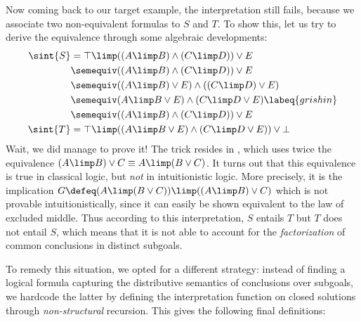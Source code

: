 Now coming back to our target example,
the interpretation still fails, because we associate two non-equivalent
formulas to $S$ and $T$. To show this, let us try to derive the equivalence
through some algebraic developments:
\begin{align}
  \sint{S} &= \top \limp ((A \limp B) \land (C \limp D)) \lor E \nonumber\\
              &\semequiv ((A \limp B) \land (C \limp D)) \lor E \nonumber\\
              &\semequiv ((A \limp B) \lor E) \land ((C \limp D) \lor E) \nonumber\\
              &\semequiv (A \limp B \lor E) \land (C \limp D \lor E) \labeq{grishin}\\
              &\semequiv ((A \limp B) \land (C \limp D)) \lor E \nonumber\\
  \sint{T} &= \top \limp ((A \limp B \lor E) \land (C \limp D \lor E)) \lor \bot \nonumber
\end{align}
Wait, we did manage to prove it! The trick resides in , which
uses twice the equivalence $(A \limp B) \lor C \equiv A \limp (B \lor C)$. It
turns out that this equivalence is true in classical logic, but \emph{not} in
intuitionistic logic. More precisely, it is the implication $G \defeq (A \limp
(B \lor C)) \limp ((A \limp B) \lor C)$ which is not provable
intuitionistically, since it can easily be shown equivalent to the law of
excluded middle. Thus according to this interpretation, $S$
entails $T$ but $T$ does not entail $S$, which means that it is not able to
account for the \emph{factorization} of common conclusions in distinct subgoals.

To remedy this situation, we opted for a different strategy: instead of finding
a logical formula capturing the distributive semantics of conclusions over
subgoals, we hardcode the latter by defining the interpretation function on
closed solutions through \emph{non-structural} recursion. This gives the
following final definitions:

